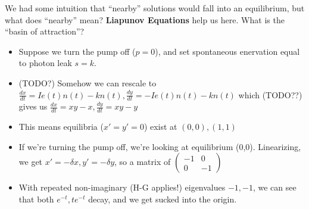 \documentclass[11pt, oneside]{article}   	%
\begin{document}
We had some intuition that ``nearby'' solutions would fall into an equilibrium, but what does ``nearby'' mean?  \textbf{Liapunov Equations} help us here.  What is the ``basin of attraction''?

\begin{itemize}
\item Suppose we turn the pump off ($p = 0$), and set spontaneous enervation equal to photon leak $s = k$.
\item (TODO?) Somehow we can rescale to $\frac{dx}{dt} = Ie(t)n(t) - kn(t), \frac{dy}{dt} = -Ie(t)n(t) - kn(t)$ which (TODO??) gives us $\frac{dx}{dt} = xy-x, \frac{dy}{dt} = xy-y$
\item This means equilibria ($x' = y' = 0$) exist at $(0,0), (1,1)$
\item If we're turning the pump off, we're looking at equilibrium (0,0).  Linearizing, we get $x' = -\delta x, y'=-\delta y$, so a matrix of $\begin{pmatrix} -1 & 0 \\ 0 & -1 \end{pmatrix}$
\item With repeated non-imaginary (H-G applies!) eigenvalues $-1, -1$, we can see that both $e^{-t}, te^{-t}$ decay, and we get sucked into the origin.
\end{itemize}
\end{document}
